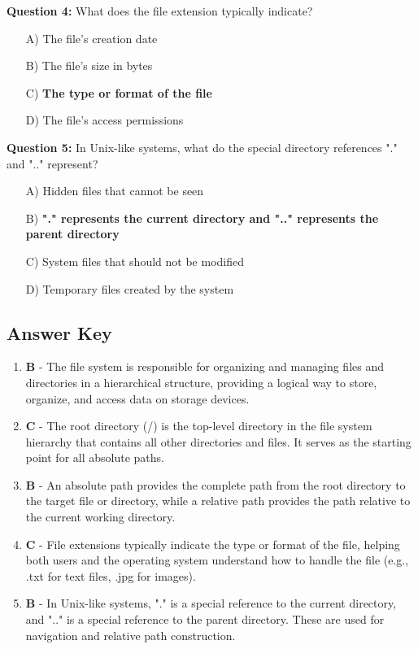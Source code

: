 \textbf{Question 4:} What does the file extension typically indicate?

\begin{enumerate}
    \item[A)] The file's creation date
    \item[B)] The file's size in bytes
    \item[C)] \textbf{The type or format of the file}
    \item[D)] The file's access permissions
\end{enumerate}

\textbf{Question 5:} In Unix-like systems, what do the special directory references "." and ".." represent?

\begin{enumerate}
    \item[A)] Hidden files that cannot be seen
    \item[B)] \textbf{"." represents the current directory and ".." represents the parent directory}
    \item[C)] System files that should not be modified
    \item[D)] Temporary files created by the system
\end{enumerate}

\subsection{Answer Key}

\begin{enumerate}
    \item \textbf{B} - The file system is responsible for organizing and managing files and directories in a hierarchical structure, providing a logical way to store, organize, and access data on storage devices.
    
    \item \textbf{C} - The root directory (/) is the top-level directory in the file system hierarchy that contains all other directories and files. It serves as the starting point for all absolute paths.
    
    \item \textbf{B} - An absolute path provides the complete path from the root directory to the target file or directory, while a relative path provides the path relative to the current working directory.
    
    \item \textbf{C} - File extensions typically indicate the type or format of the file, helping both users and the operating system understand how to handle the file (e.g., .txt for text files, .jpg for images).
    
    \item \textbf{B} - In Unix-like systems, "." is a special reference to the current directory, and ".." is a special reference to the parent directory. These are used for navigation and relative path construction.
\end{enumerate}
